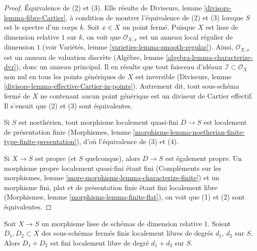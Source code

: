 \begin{proof}
Équivalence de (2) et (3). Elle résulte de
Diviseurs, lemme \ref{divisors-lemma-fibre-Cartier},
à condition de montrer l'équivalence de (2) et (3) lorsque
$S$ est le spectre d'un corps $k$. Soit $x \in X$ un point fermé.
Puisque $X$ est lisse de dimension relative $1$ sur $k$, on voit que
$\mathcal{O}_{X, x}$ est un anneau local régulier de dimension $1$
(voir Variétés, lemme \ref{varieties-lemma-smooth-regular}).
Ainsi, $\mathcal{O}_{X, x}$ est un anneau de valuation discrète
(Algèbre, lemme \ref{algebra-lemma-characterize-dvr}),
donc un anneau principal. Il en résulte que tout faisceau d'idéaux
$\mathcal{I} \subset \mathcal{O}_X$ non nul en tous
les points génériques de $X$ est inversible
(Diviseurs, lemme \ref{divisors-lemma-effective-Cartier-in-points}).
Autrement dit, tout sous-schéma fermé de $X$ ne contenant
aucun point générique est un diviseur de Cartier effectif.
Il s'ensuit que (2) et (3) sont équivalentes.

\medskip\noindent
Si $S$ est noethérien, tout morphisme localement quasi-fini
$D \to S$ est localement de présentation finie (Morphismes, lemme
\ref{morphisms-lemma-noetherian-finite-type-finite-presentation}),
d'où l'équivalence de (3) et (4).

\medskip\noindent
Si $X \to S$ est propre (et $S$ quelconque), alors $D \to S$ est
également propre. Un morphisme propre localement quasi-fini étant fini
(Compléments sur les morphismes, lemme \ref{more-morphisms-lemma-characterize-finite})
et un morphisme fini, plat et de présentation finie étant fini localement libre
(Morphismes, lemme \ref{morphisms-lemma-finite-flat}), on voit que
(1) et (2) sont équivalentes.
\end{proof}

\begin{lemma}
\label{lemma-sum-divisors-on-curves}
Soit $X \to S$ un morphisme lisse de schémas de dimension relative $1$.
Soient $D_1, D_2 \subset X$ des sous-schémas fermés finis localement libres de
degrés $d_1$, $d_2$ sur $S$. Alors $D_1 + D_2$ est fini localement libre
de degré $d_1 + d_2$ sur $S$.
\end{lemma}

